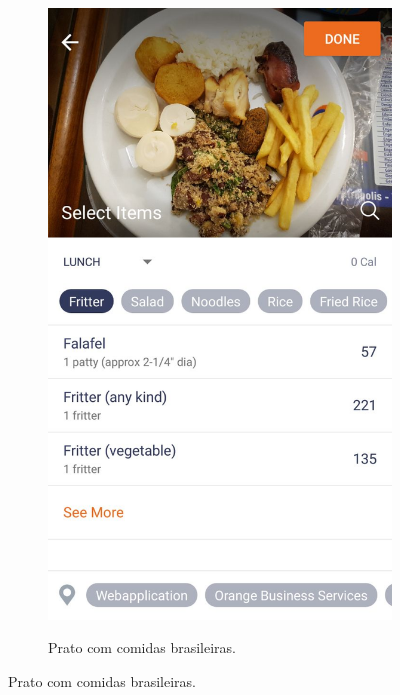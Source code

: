 \begin{figure}[!ht]
\begin{subfigure}{0.4\textwidth}
  \label{fig:sub1}
\end{subfigure}%
\hspace{.1\textwidth}
\begin{subfigure}{0.4\textwidth}
  \centering
    \caption{Prato com comidas brasileiras.}
  \includegraphics[width=\textwidth]{imgs/brasileira.jpeg}
  \label{fig:sub2}
\end{subfigure}

\label{fig:test}
\end{figure}



